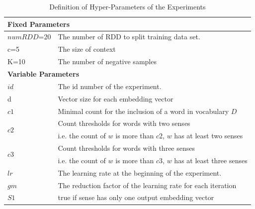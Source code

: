 \begin{table}[tb]
	\caption{Definition of Hyper-Parameters of the Experiments } \label{tab:notationhyper}
	\begin{center}
		\begin{tabular}{|l|l|}
			\hline
			\multicolumn{2}{|l|}{\bf Fixed Parameters}  \\ \hline
			$numRDD$=20 & The number of RDD to split training data set.\\ \hline
			\gls{c}=5& The size of context  \\ \hline
			\gls{K}=10& The number of negative samples\\ \hline
			\multicolumn{2}{|l|}{\bf Variable Parameters}  \\ \hline
			$id$ & The id number of the experiment. \\ \hline
			
			\gls{d} & Vector size for each embedding vector  \\ \hline
			$c1$ &  Minimal count for the inclusion of a word in vocabulary $D$\\ \hline
			\multirow{2}{*}{$c2$} 
			&  Count thresholds for words with two senses\\
			&  i.e. the count of $w$ is more than $c2$, $w$ has at least two senses\\ 
			\hline
			\multirow{2}{*}{$c3$} 
			&  Count thresholds for words with three senses\\
			&  i.e. the count of $w$ is more than $c3$, $w$ has at least three senses\\ \hline
			$lr$ &  The learning rate at the beginning of the experiment.\\ \hline
			$gm$ &  The reduction factor of the learning rate for each iteration\\ \hline
			$S1$ & true if sense has only one output embedding vector\\ 
			\hline
		\end{tabular}
	\end{center}
\end{table}


